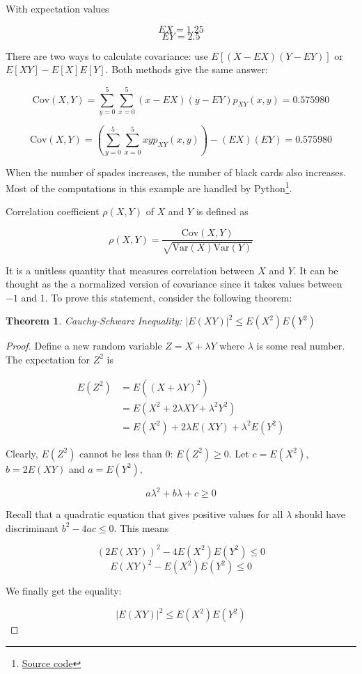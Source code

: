 \documentclass[12pt, a4paper]{article}
\newcounter{exa}
\newtheorem*{theorem}{Theorem}
\begin{document}
\begin{texample}
With expectation values

\[EX=1.25\]
\[EY=2.5\]

There are two ways to calculate covariance: use $E[(X-EX)(Y-EY)]$ or $E[XY]-E[X]E[Y]$. Both methods give the same answer:

\[\text{Cov}(X,Y)=\sum_{y=0}^5\sum_{x=0}^5 (x-EX)(y-EY) p_{XY}(x,y)=0.575980\]

\[\text{Cov}(X,Y)=\left( \sum_{y=0}^5\sum_{x=0}^5 xyp_{XY}(x,y) \right)-(EX)(EY)=0.575980\]

When the number of spades increases, the number of black cards also increases. \\

Most of the computations in this example are handled by Python\footnote{\href{https://gist.github.com/marethyu/777e372c69cb356c5fc8c93f59cf62e6}{Source code}}.
\end{texample}

Correlation coefficient $\rho(X,Y)$ of $X$ and $Y$ is defined as

\[\rho(X,Y)=\frac{\text{Cov}(X,Y)}{\sqrt{\text{Var}(X)\text{Var}(Y)}}\]

It is a unitless quantity that measures correlation between $X$ and $Y$. It can be thought as the a normalized version of covariance since it takes values between $-1$ and $1$. To prove this statement, consider the following theorem:

\begin{theorem}
Cauchy-Schwarz Inequality: $|E(XY)|^2 \le E(X^2)E(Y^2)$
\end{theorem}

\begin{proof}
Define a new random variable $Z=X+\lambda Y$ where $\lambda$ is some real number. \\

The expectation for $Z^2$ is

\begin{align*}
E(Z^2)&=E((X+\lambda Y)^2) \\
&=E(X^2+2\lambda XY+\lambda^2Y^2) \\
&=E(X^2)+2\lambda E(XY)+\lambda^2 E(Y^2)
\end{align*}

Clearly, $E(Z^2)$ cannot be less than 0: $E(Z^2)\ge0$. Let $c=E(X^2)$, $b=2E(XY)$ and $a=E(Y^2)$,

\[ a\lambda^2+b\lambda+c\ge0 \]

Recall that a quadratic equation that gives positive values for all $\lambda$ should have discriminant $b^2-4ac \le 0$. This means

\[(2E(XY))^2-4E(X^2)E(Y^2)\le0\]
\[E(XY)^2-E(X^2)E(Y^2)\le0\]

We finally get the equality:

\[|E(XY)|^2 \le E(X^2)E(Y^2)\]

\end{proof}
\end{document}
